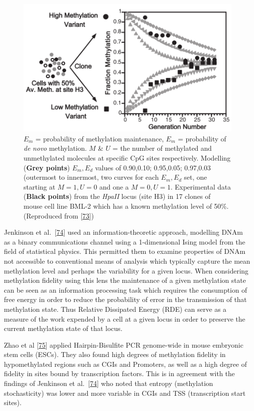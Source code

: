 \documentclass[
]{book}
\begin{document}
\begin{figure}

{\centering \includegraphics[width=0.7\linewidth]{figs/Riggs2004PNASfig2DNAmFidelity} 

}

\caption{\(E_m\) = probability of methylation maintenance, \(E_m\) = probability of \emph{de novo} methylation. \(M\) \& \(U\) = the number of methylated and unmethylated molecules at specific CpG sites respectively. Modelling (\textbf{Grey points}) \(E_m,E_d\) values of 0.90,0.10; 0.95,0.05; 0.97,0.03 (outermost to innermost, two curves for each \(E_m,E_d\) set, one starting at \(M=1,U=0\) and one a \(M=0,U=1\). Experimental data (\textbf{Black points}) from the \emph{HpaII} locus (site H3) in 17 clones of mouse cell line BML-2 which has a known methylation level of 50\%. (Reproduced from {[}\protect\hyperlink{ref-Riggs2004a}{73}{]})}\label{fig:Riggs2004PNASfig2DNAmFidelity}
\end{figure}



Jenkinson et al.~{[}\protect\hyperlink{ref-Jenkinson2017}{74}{]} used an information-theoretic approach, modelling DNAm as a binary communications channel using a 1-dimensional Ising model from the field of statistical physics.
This permitted them to examine properties of DNAm not accessible to conventional means of analysis which typically capture the mean methylation level and perhaps the variability for a given locus.
When considering methylation fidelity using this lens the maintenance of a given methylation state can be seen as an information processing task which requires the consumption of free energy in order to reduce the probability of error in the transmission of that methylation state.
Thus Relative Dissipated Energy (RDE) can serve as a measure of the work expended by a cell at a given locus in order to preserve the current methylation state of that locus.

Zhao et al {[}\protect\hyperlink{ref-Zhao2014}{75}{]} applied Hairpin-Bisulfite PCR genome-wide in mouse embryonic stem cells (ESCs).
They also found high degrees of methylation fidelity in hypomethylated regions such as CGIs and Promoters, as well as a high degree of fidelity in sites bound by transcription factors.
This is in agreement with the findings of Jenkinson et al.~{[}\protect\hyperlink{ref-Jenkinson2017}{74}{]} who noted that entropy (methylation stochasticity) was lower and more variable in CGIs and TSS (transcription start sites).
\end{document}
